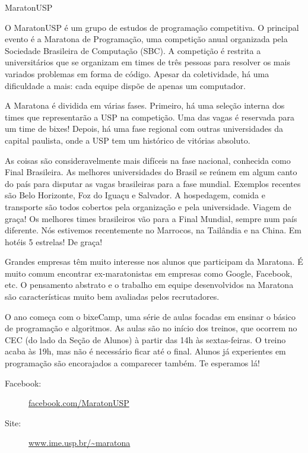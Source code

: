 \begin{subsecao}{MaratonUSP}


O MaratonUSP é um grupo de estudos de programação competitiva. O principal evento é a Maratona de Programação, uma competição anual organizada pela Sociedade Brasileira de Computação (SBC). A competição é restrita a universitários que se organizam em times de três pessoas para resolver os mais variados problemas em forma de código. Apesar da coletividade, há uma dificuldade a mais: cada equipe dispõe de apenas um computador.

A Maratona é dividida em várias fases. Primeiro, há uma seleção interna dos times que representarão a USP na competição. Uma das vagas é reservada para um time de bixes! Depois, há uma fase regional com outras universidades da capital paulista, onde a USP tem um histórico de vitórias absoluto.

As coisas são consideravelmente mais difíceis na fase nacional, conhecida como Final Brasileira. As melhores universidades do Brasil se reúnem em algum canto do país para disputar as vagas brasileiras para a fase mundial. Exemplos recentes são Belo Horizonte, Foz do Iguaçu e Salvador. A hospedagem, comida e transporte são todos cobertos pela organização e pela universidade. Viagem de graça! Os melhores times brasileiros vão para a Final Mundial, sempre num país diferente. Nós estivemos recentemente no Marrocos, na Tailândia e na China. Em hotéis 5 estrelas! De graça!

Grandes empresas têm muito interesse nos alunos que participam da Maratona. É muito comum encontrar ex-maratonistas em empresas como Google, Facebook, etc. O pensamento abstrato e o trabalho em equipe desenvolvidos na Maratona são características muito bem avaliadas pelos recrutadores.

O ano começa com o bixeCamp, uma série de aulas focadas em ensinar o básico de programação e algoritmos. As aulas são no início dos treinos, que ocorrem no CEC (do lado da Seção de Alunos) à partir das 14h às sextas-feiras. O treino acaba às 19h, mas não é necessário ficar até o final. Alunos já experientes em programação são encorajados a comparecer também. Te esperamos lá!

\begin{description}
\item [Facebook:] \url{facebook.com/MaratonUSP}
\item[Site:] \url{www.ime.usp.br/~maratona}
\end{description}

\end{subsecao}
